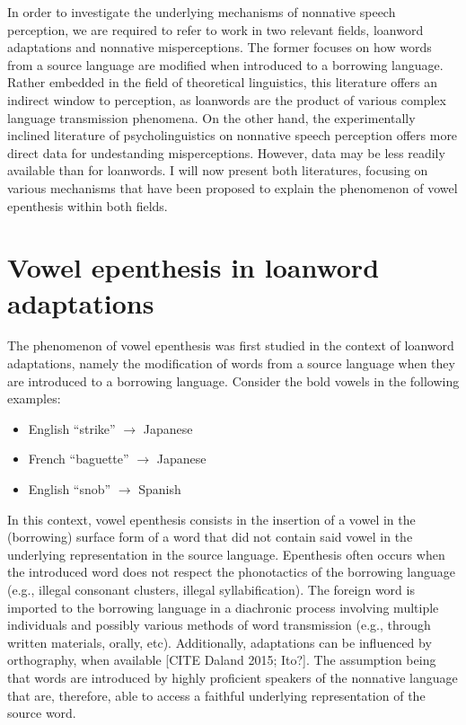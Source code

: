 In order to investigate the underlying mechanisms of nonnative speech perception, we are required to refer to work in two relevant fields, loanword adaptations and nonnative misperceptions.
The former focuses on how words from a source language are modified when introduced to a borrowing language. Rather embedded in the field of theoretical linguistics, this literature offers an indirect window to perception, as loanwords are the product of various complex language transmission phenomena. 
On the other hand, the experimentally inclined literature of psycholinguistics on nonnative speech perception offers more direct data for undestanding misperceptions. However, data may be less readily available than for loanwords. I will now present both literatures, focusing on various mechanisms that have been proposed to explain the phenomenon of vowel epenthesis within both fields.  

\section{Vowel epenthesis in loanword adaptations}
The phenomenon of vowel epenthesis was first studied in the context of loanword adaptations, namely the modification of words from a source language when they are introduced to a borrowing language. Consider the bold vowels in the following examples:
\begin{itemize}
  \item English ``strike''  $\rightarrow$ Japanese 
  \item French ``baguette''  $\rightarrow$ Japanese  %
  \item English ``snob''  $\rightarrow$ Spanish 
  \end{itemize}
  
In this context, vowel epenthesis consists in the insertion of a vowel in the (borrowing) surface form of a word that did not contain said vowel in the underlying representation in the source language. Epenthesis often occurs when the introduced word does not respect the phonotactics of the borrowing language (e.g., illegal consonant clusters, illegal syllabification).
The foreign word is imported to the borrowing language in a diachronic process involving multiple individuals and possibly various methods of word transmission (e.g., through written materials, orally, etc). Additionally, adaptations can be influenced by orthography, when available [CITE Daland 2015; Ito?]. The assumption being that words are introduced by highly proficient speakers of the nonnative language that are, therefore, able to access a faithful underlying representation of the source word. 

